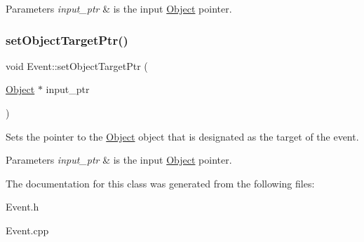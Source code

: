 \begin{DoxyParams}{Parameters}
{\em input\+\_\+ptr} & is the input \hyperlink{class_object}{Object} pointer. \\
\hline
\end{DoxyParams}
\mbox{\label{class_event_a2e868dc951b6fec86703dcd7776680e0}} 
\subsubsection{\texorpdfstring{set\+Object\+Target\+Ptr()}{setObjectTargetPtr()}}
{\footnotesize\ttfamily void Event\+::set\+Object\+Target\+Ptr (\begin{DoxyParamCaption}\item[{\hyperlink{class_object}{Object} $\ast$}]{input\+\_\+ptr }\end{DoxyParamCaption})}



Sets the pointer to the \hyperlink{class_object}{Object} object that is designated as the target of the event. 


\begin{DoxyParams}{Parameters}
{\em input\+\_\+ptr} & is the input \hyperlink{class_object}{Object} pointer. \\
\hline
\end{DoxyParams}


The documentation for this class was generated from the following files\+:\begin{DoxyCompactItemize}
\item 
Event.\+h\item 
Event.\+cpp\end{DoxyCompactItemize}
